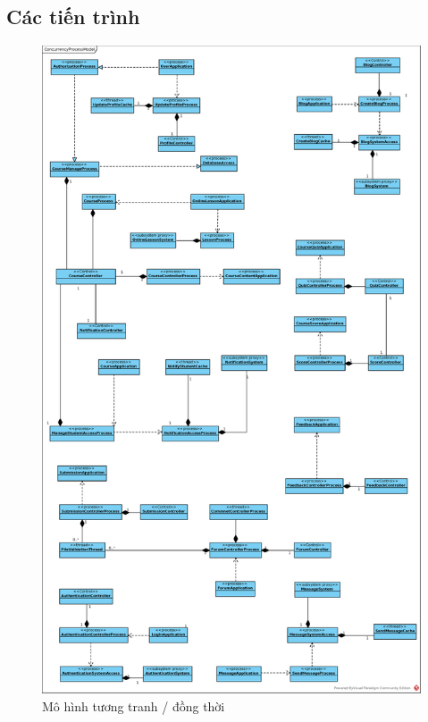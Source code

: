\documentclass[./../main.tex]{subfiles}
\begin{document}
\subsection{Các tiến trình}
\begin{figure}[H]
	\centering
	\includegraphics[width=0.75\linewidth]{./images/ConcurrencyProcessModel.eps}
	\caption{Mô hình tương tranh / đồng thời}
\end{figure}
\end{document}
